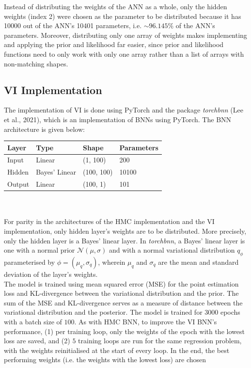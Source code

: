 \documentclass[conference]{IEEEtran}
\begin{document}
Instead of distributing the weights of the ANN as a whole, only the hidden weights (index 2) were chosen as the parameter to be distributed because it has 10000 out of the ANN's 10401 parameters, i.e. $\sim 96.145\%$ of the ANN's parameters. Moreover, distributing only one array of weights makes implementing and applying the prior and likelihood far easier, since prior and likelihood functions need to only work with only one array rather than a list of arrays with non-matching shapes.\\

\subsection{VI Implementation}
The implementation of VI is done using PyTorch and the package \textit{torchbnn} (Lee et al., 2021), which is an implementation of BNNs using PyTorch. The BNN architecture is given below:\\

\begin{tabular}{| m{1cm} | m{2cm} | m{1.5cm} | m{2cm} |}
    \hline
    \textbf{Layer} & \textbf{Type} & \textbf{Shape} & \textbf{Parameters}\\
    \hline
    Input & Linear & (1, 100) & 200\\
    \hline
    Hidden & Bayes' Linear & (100, 100) & 10100\\
    \hline
    Output & Linear & (100, 1) & 101\\
    \hline
\end{tabular}\\~\\

For parity in the architectures of the HMC implementation and the VI implementation, only hidden layer's weights are to be distributed. More precisely, only the hidden layer is a Bayes' linear layer. In \textit{torchbnn}, a Bayes' linear layer is one with a normal prior $\mathcal{N}(\mu, \sigma)$ and with a normal variational distribution $q_\phi$ parameterised by $\phi = (\mu_q, \sigma_q)$, wherein $\mu_q$ and $\sigma_q$ are the mean and standard deviation of the layer's weights.\\

The model is trained using mean squared error (MSE) for the point estimation loss and KL-divergence between the variational distribution and the prior. The sum of the MSE and KL-divergence serves as a measure of distance between the variational distribution and the posterior. The model is trained for $3000$ epochs with a batch size of $100$. As with HMC BNN, to improve the VI BNN's performance, (1) per training loop, only the weights of the epoch with the lowest loss are saved, and (2) $5$ training loops are run for the same regression problem, with the weights reinitialised at the start of every loop. In the end, the best performing weights (i.e. the weights with the lowest loss) are chosen
\end{document}
